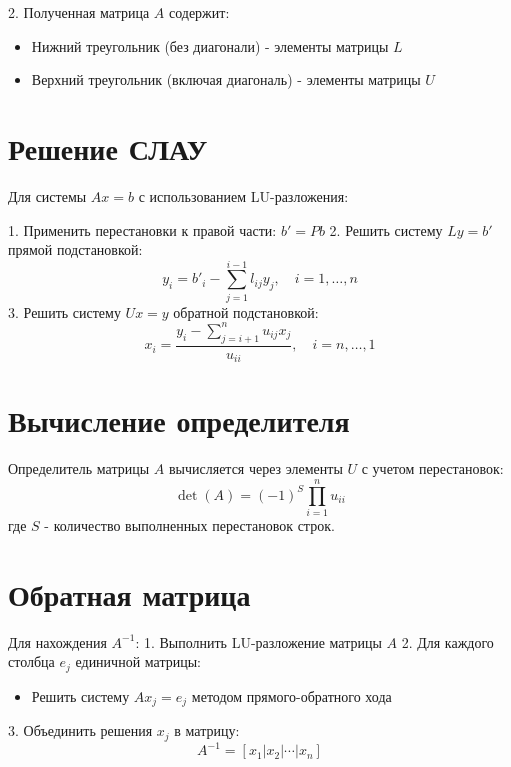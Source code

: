 2. Полученная матрица $A$ содержит:
\begin{itemize}
\item Нижний треугольник (без диагонали) - элементы матрицы $L$
\item Верхний треугольник (включая диагональ) - элементы матрицы $U$
\end{itemize}

\section*{Решение СЛАУ}

Для системы $Ax = b$ с использованием LU-разложения:

1. Применить перестановки к правой части: $b' = Pb$
2. Решить систему $Ly = b'$ прямой подстановкой:
\begin{equation}
y_i = b'_i - \sum_{j=1}^{i-1} l_{ij}y_j, \quad i=1,\ldots,n
\end{equation}
3. Решить систему $Ux = y$ обратной подстановкой:
\begin{equation}
x_i = \frac{y_i - \sum_{j=i+1}^n u_{ij}x_j}{u_{ii}}, \quad i=n,\ldots,1
\end{equation}

\section*{Вычисление определителя}

Определитель матрицы $A$ вычисляется через элементы $U$ с учетом перестановок:
\begin{equation}
\det(A) = (-1)^S \prod_{i=1}^n u_{ii}
\end{equation}
где $S$ - количество выполненных перестановок строк.

\section*{Обратная матрица}

Для нахождения $A^{-1}$:
1. Выполнить LU-разложение матрицы $A$
2. Для каждого столбца $e_j$ единичной матрицы:
\begin{itemize}
\item Решить систему $Ax_j = e_j$ методом прямого-обратного хода
\end{itemize}
3. Объединить решения $x_j$ в матрицу:
\begin{equation}
A^{-1} = [x_1 | x_2 | \cdots | x_n]
\end{equation}

